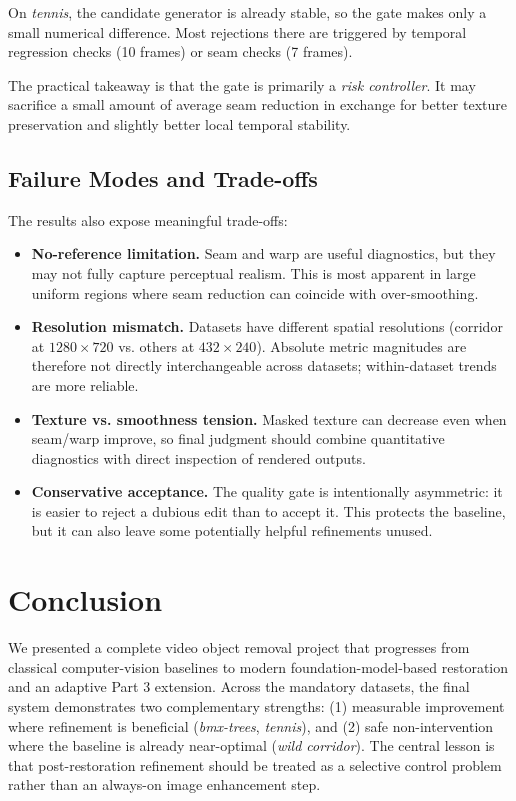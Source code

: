 \documentclass[10pt,twocolumn,letterpaper]{article}
\begin{document}
On \textit{tennis}, the candidate generator is already stable, so the gate makes only a small numerical difference. Most rejections there are triggered by temporal regression checks (10 frames) or seam checks (7 frames).

The practical takeaway is that the gate is primarily a \emph{risk controller}. It may sacrifice a small amount of average seam reduction in exchange for better texture preservation and slightly better local temporal stability.

\subsection{Failure Modes and Trade-offs}
The results also expose meaningful trade-offs:
\begin{itemize}
    \item \textbf{No-reference limitation.} Seam and warp are useful diagnostics, but they may not fully capture perceptual realism. This is most apparent in large uniform regions where seam reduction can coincide with over-smoothing.
    \item \textbf{Resolution mismatch.} Datasets have different spatial resolutions (corridor at $1280\times720$ vs. others at $432\times240$). Absolute metric magnitudes are therefore not directly interchangeable across datasets; within-dataset trends are more reliable.
    \item \textbf{Texture vs. smoothness tension.} Masked texture can decrease even when seam/warp improve, so final judgment should combine quantitative diagnostics with direct inspection of rendered outputs.
    \item \textbf{Conservative acceptance.} The quality gate is intentionally asymmetric: it is easier to reject a dubious edit than to accept it. This protects the baseline, but it can also leave some potentially helpful refinements unused.
\end{itemize}

\section{Conclusion}
We presented a complete video object removal project that progresses from classical computer-vision baselines to modern foundation-model-based restoration and an adaptive Part 3 extension. Across the mandatory datasets, the final system demonstrates two complementary strengths: (1) measurable improvement where refinement is beneficial (\textit{bmx-trees}, \textit{tennis}), and (2) safe non-intervention where the baseline is already near-optimal (\textit{wild corridor}). The central lesson is that post-restoration refinement should be treated as a selective control problem rather than an always-on image enhancement step.
\end{document}
